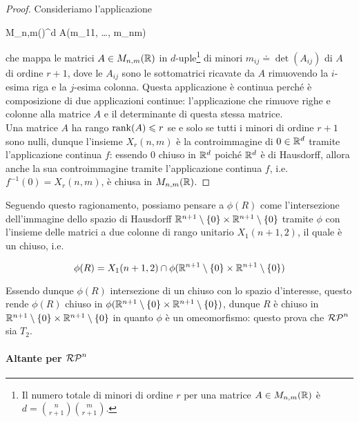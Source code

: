 \begin{proof}
	Consideriamo l'applicazione
	
		{M_{n,m}(\R)}{\R^{d}}
		{A}{(m_{11}, \dots, m_{nm})}

	che mappa le matrici $ A \in M_{n,m}(\mathbb{R}) $ in $ d $-uple\footnote{%
		Il numero totale di minori di ordine $ r $ per una matrice $ A \in M_{n,m}(\mathbb{R}) $ è $ d = \binom{n}{r+1} \binom{m}{r+1} $.%
	} di minori $ m_{ij} \doteq \det(A_{ij}) $ di $ A $ di ordine $ r + 1 $, dove le $ A_{ij} $ sono le sottomatrici ricavate da $ A $ rimuovendo la $ i $-esima riga e la $ j $-esima colonna. Questa applicazione è continua perché è composizione di due applicazioni continue: l'applicazione che rimuove righe e colonne alla matrice $ A $ e il determinante di questa stessa matrice.\\
	Una matrice $ A $ ha rango $ \rank(A) \leqslant r $ se e solo se tutti i minori di ordine $ r+1 $ sono nulli, dunque l'insieme $ X_{r}(n,m) $ è la controimmagine di $ 0 \in \mathbb{R}^{d} $ tramite l'applicazione continua $ f $: essendo $ 0 $ chiuso in $ \mathbb{R}^{d} $ poiché $ \mathbb{R}^{d} $ è di Hausdorff, allora anche la sua controimmagine tramite l'applicazione continua $ f $, i.e. $ f^{-1}(0) = X_{r}(n,m) $, è chiusa in $ M_{n,m}(\mathbb{R}) $.
\end{proof}

Seguendo questo ragionamento, possiamo pensare a $ \phi(R) $ come l'intersezione dell'immagine dello spazio di Hausdorff $ \mathbb{R}^{n+1} \setminus \{0\} \times \mathbb{R}^{n+1} \setminus \{0\} $ tramite $ \phi $ con l'insieme delle matrici a due colonne di rango unitario $ X_{1}(n+1,2) $, il quale è un chiuso, i.e.

\begin{equation}
	\phi(R) = X_{1}(n+1,2) \cap \phi(\mathbb{R}^{n+1} \setminus \{0\} \times \mathbb{R}^{n+1} \setminus \{0\})
\end{equation}

Essendo dunque $ \phi(R) $ intersezione di un chiuso con lo spazio d'interesse, questo rende $ \phi(R) $ chiuso in $ \phi(\mathbb{R}^{n+1} \setminus \{0\} \times \mathbb{R}^{n+1} \setminus \{0\}) $, dunque $ R $ è chiuso in $ \mathbb{R}^{n+1} \setminus \{0\} \times \mathbb{R}^{n+1} \setminus \{0\} $ in quanto $ \phi $ è un omeomorfismo: questo prova che $ \mathcal{RP}^{n} $ sia $ T_{2} $.\\

\paragraph{Altante per $ \mathcal{RP}^{n} $}

